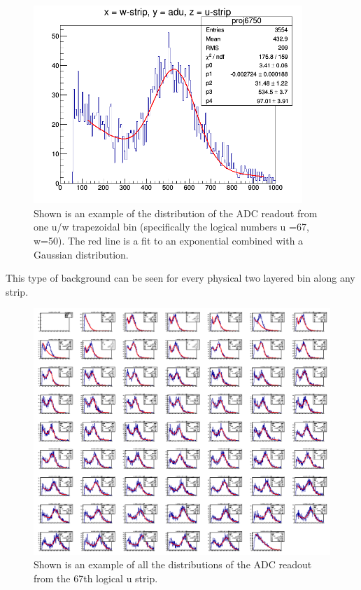 \begin{figure}[h]
    \centering
    \includegraphics[width= 4in, keepaspectratio = true]{distribution}
    \caption{Shown is an example of the distribution of the ADC readout from one u/w trapezoidal bin 
    (specifically the logical numbers u =67, w=50). The red line is a fit to an exponential combined with 
    a Gaussian distribution.}
    \label{fig:distribution}
\end{figure}

This type of background can be seen for every physical two layered bin along any strip.

\begin{figure}[h]
    \centering
    \includegraphics[width= 6in, keepaspectratio = true]{allstrip67}
    \caption{Shown is an example of all the distributions of the ADC readout from the 67th logical u strip.}
    \label{fig:allstrip67}
\end{figure}


